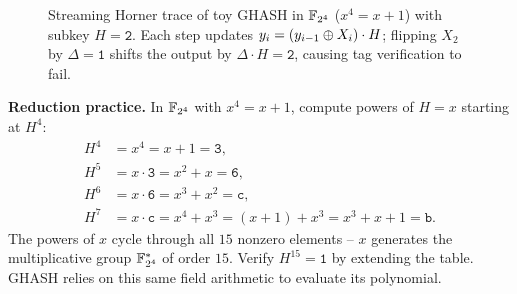 \begin{figure}[htbp]
\caption{Streaming Horner trace of toy GHASH in $\mathbb{F}_{2^4}$ ($x^4 = x + 1$) with subkey $H = \texttt{2}$. Each step updates $y_i = (y_{i-1} \oplus X_i) \cdot H$; flipping $X_2$ by $\Delta = \texttt{1}$ shifts the output by $\Delta \cdot H = \texttt{2}$, causing tag verification to fail.}
\label{fig:ch16-ghash-trace}
\end{figure}

\begin{labbox}
\textbf{Reduction practice.} In $\mathbb{F}_{2^4}$ with $x^4 = x+1$, compute powers of $H=x$ starting at $H^4$:
\begin{align*}
H^4 &= x^4 = x + 1 = \texttt{3}, \\
H^5 &= x \cdot \texttt{3} = x^2 + x = \texttt{6}, \\
H^6 &= x \cdot \texttt{6} = x^3 + x^2 = \texttt{c}, \\
H^7 &= x \cdot \texttt{c} = x^4 + x^3 = (x+1) + x^3 = x^3 + x + 1 = \texttt{b}.
\end{align*}
The powers of $x$ cycle through all $15$ nonzero elements -- $x$ generates the multiplicative group $\mathbb{F}_{2^4}^{*}$ of order $15$. Verify $H^{15} = \texttt{1}$ by extending the table. GHASH relies on this same field arithmetic to evaluate its polynomial.
\end{labbox}

